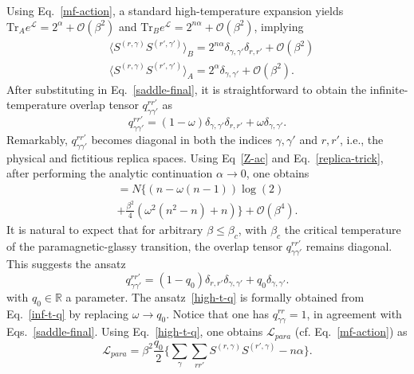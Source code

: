 \documentclass[twocolumn,superscriptaddress,prb,10pt]{revtex4-1}
\def\tr{\textrm{Tr}}
\begin{document}
Using Eq.~\eqref{mf-action}, a standard high-temperature expansion yields 
$\tr_Ae^{{\mathcal L}}=2^{\alpha}+{\mathcal O}(\beta^2)$ and $\tr_B e^{{
\mathcal L}}=2^{n\alpha}+{\mathcal O}(\beta^2)$, implying  
%
\begin{align}
& \langle S^{(r,\gamma)}S^{(r',\gamma')}\rangle_B=2^{n\alpha}
\delta_{\gamma,\gamma'}\delta_{r,r'}+{\mathcal O}(\beta^2)\\
& \langle S^{(r,\gamma)}S^{(r',\gamma')}\rangle_A=2^{\alpha}
\delta_{\gamma,\gamma'}+{\mathcal O}(\beta^2).
\end{align}
%
After substituting in Eq.~\eqref{saddle-final}, it is straightforward to 
obtain the infinite-temperature overlap tensor $q_{\gamma\gamma'}^{rr'}$ 
as 
%
\begin{equation}
q_{\gamma\gamma'}^{rr'}=(1-\omega)\delta_{\gamma,\gamma'}\delta_{r,r'}+
\omega\delta_{\gamma,\gamma'}.
\label{inf-t-q}
\end{equation}
%
Remarkably, $q_{\gamma\gamma'}^{rr'}$ becomes diagonal in both the 
indices $\gamma,\gamma'$ and $r,r'$, i.e.,  the physical and 
fictitious replica spaces. Using Eq~\eqref{Z-ac} and Eq.~\eqref{replica-trick}, 
after performing the analytic continuation $\alpha\to 0$, one obtains  
%
\begin{multline}
[F_{para}(\omega,n,\beta)]=N\Big\{(n-\omega(n-1))\log(2)\\
+\frac{\beta^2}{4}(\omega^2(n^2-n)+n)\Big\}+
{\mathcal O}(\beta^4).
\label{logZ-ht}
\end{multline}
% 
It is natural to expect that for arbitrary $\beta\le\beta_c$, with 
$\beta_c$ the critical temperature of the paramagnetic-glassy 
transition, the overlap tensor $q_{\gamma\gamma'}^{rr'}$ remains 
diagonal. This suggests the ansatz 
%
\begin{equation}
q_{\gamma\gamma'}^{rr'}=(1-q_0)\delta_{r,r'}\delta_{\gamma,\gamma'}+
q_0\delta_{\gamma,\gamma'}.
\label{high-t-q}
\end{equation}
%
with $q_0\in {\mathbb R}$ a parameter. The ansatz~\eqref{high-t-q} is formally 
obtained from Eq.~\eqref{inf-t-q} by replacing $\omega\to q_0$. Notice that 
one has $q_{\gamma\gamma}^{rr}=1$, in agreement with Eqs.~\eqref{saddle-final}. 
Using Eq.~\eqref{high-t-q}, one obtains ${\mathcal L}_{para}$ (cf. 
Eq.~\eqref{mf-action}) as   
%
\begin{equation}
\label{high-t-action}
{\mathcal L}_{para}=\beta^2\frac{q_0}{2}\Big\{\sum_\gamma\sum_{rr'}S^{(r,
\gamma)}S^{(r',\gamma)}-n\alpha\Big\}.
\end{equation}
\end{document}
